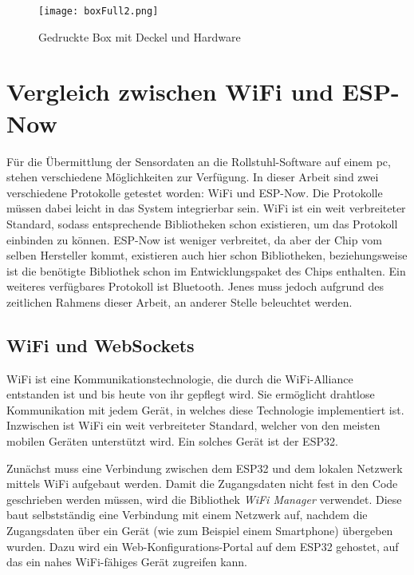 \begin{figure}[h]
    \centering
    \texttt{[image: boxFull2.png]}
    \caption{Gedruckte Box mit Deckel und Hardware}
    \label{fig:gedruckteBox}
\end{figure}

\section{Vergleich zwischen WiFi und ESP-Now}
Für die Übermittlung der Sensordaten an die Rollstuhl-Software auf einem \ac{pc}, stehen verschiedene Möglichkeiten zur Verfügung.
In dieser Arbeit sind zwei verschiedene Protokolle getestet worden: WiFi und ESP-Now. Die Protokolle müssen dabei leicht in das System integrierbar sein.
WiFi ist ein weit verbreiteter Standard, sodass entsprechende Bibliotheken schon existieren, um das Protokoll einbinden zu können\cite{WiFiArduinoReference}.
ESP-Now ist weniger verbreitet, da aber der Chip vom selben Hersteller kommt, existieren auch hier schon Bibliotheken, beziehungsweise ist die benötigte Bibliothek schon im Entwicklungspaket des Chips enthalten\cite{EspressifIoTDevelopment2022}.
Ein weiteres verfügbares Protokoll ist Bluetooth.
Jenes muss jedoch aufgrund des zeitlichen Rahmens dieser Arbeit, an anderer Stelle beleuchtet werden.

\subsection{WiFi und WebSockets}
WiFi ist eine Kommunikationstechnologie, die durch die WiFi-Alliance entstanden ist und bis heute von ihr gepflegt wird\cite{WhoWeAre}.
Sie ermöglicht drahtlose Kommunikation mit jedem Gerät, in welches diese Technologie implementiert ist.
Inzwischen ist WiFi ein weit verbreiteter Standard, welcher von den meisten mobilen Geräten unterstützt wird\cite{DiscoverWiFiWiFi}.
Ein solches Gerät ist der ESP32.

Zunächst muss eine Verbindung zwischen dem ESP32 und dem lokalen Netzwerk mittels WiFi aufgebaut werden.
Damit die Zugangsdaten nicht fest in den Code geschrieben werden müssen, wird die Bibliothek \textit{WiFi Manager}\cite{tzapuWiFiManager2022} verwendet.
Diese baut selbstständig eine Verbindung mit einem Netzwerk auf, nachdem die Zugangsdaten über ein Gerät (wie zum Beispiel einem Smartphone) übergeben wurden.
Dazu wird ein Web-Konfigurations-Portal auf dem ESP32 gehostet, auf das ein nahes WiFi-fähiges Gerät zugreifen kann.

